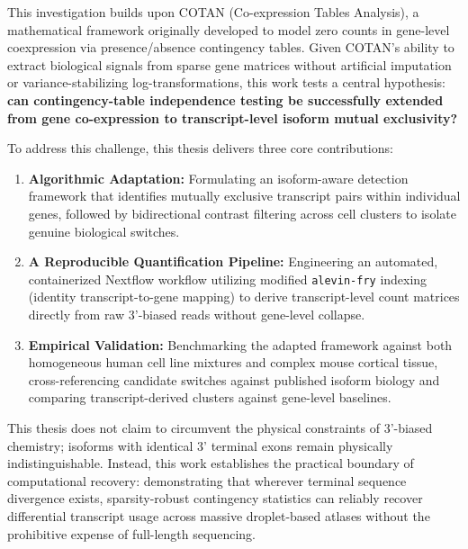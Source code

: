 This investigation builds upon COTAN (Co-expression Tables Analysis), a mathematical framework originally developed to model zero counts in gene-level \gls{coexpression} via presence/absence contingency tables. Given COTAN's ability to extract biological signals from sparse gene matrices without artificial imputation or variance-stabilizing log-transformations, this work tests a central hypothesis: \textbf{can contingency-table independence testing be successfully extended from gene co-expression to transcript-level isoform mutual exclusivity?}

To address this challenge, this thesis delivers three core contributions:

\begin{enumerate}
    \item \textbf{Algorithmic Adaptation:} Formulating an isoform-aware detection framework that identifies mutually exclusive transcript pairs within individual genes, followed by bidirectional contrast filtering across cell clusters to isolate genuine biological switches.

    \item \textbf{A Reproducible Quantification Pipeline:} Engineering an automated, containerized Nextflow workflow utilizing modified \texttt{alevin-fry} indexing (identity transcript-to-gene mapping) to derive transcript-level count matrices directly from raw 3'-biased reads without gene-level collapse.

    \item \textbf{Empirical Validation:} Benchmarking the adapted framework against both homogeneous human cell line mixtures and complex mouse cortical tissue, cross-referencing candidate switches against published isoform biology and comparing transcript-derived clusters against gene-level baselines.
\end{enumerate}

This thesis does not claim to circumvent the physical constraints of 3'-biased chemistry; isoforms with identical 3' terminal exons remain physically indistinguishable. Instead, this work establishes the practical boundary of computational recovery: demonstrating that wherever terminal sequence divergence exists, sparsity-robust contingency statistics can reliably recover differential transcript usage across massive droplet-based atlases without the prohibitive expense of full-length sequencing.

